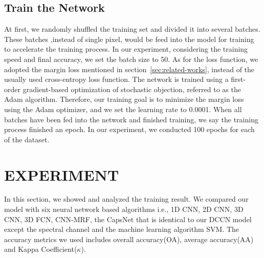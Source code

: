 \documentclass{article}
\begin{document}
	\subsection{Train the Network}\label{subsec:train-the-network}
	At first, we randomly shuffled the training set and divided it into several batches.
	These batches ,instead of single pixel, would be feed into the model for training to accelerate the training process.
	In our experiment, considering the training speed and final accuracy, we set the batch size to 50.
	As for the loss function, we adopted the margin loss mentioned in section~\ref{sec:related-works}, instead of the
	usually used cross-entropy loss function.
	The network is trained using a first-order gradient-based optimization of stochastic objection, referred to as the
	Adam algorithm.
	Therefore, our training goal is to minimize the margin loss using the Adam optimizer, and we set the learning rate
	to 0.0001.
	When all batches have been fed into the network and finished training, we say the training process finished an epoch.
	In our experiment, we conducted 100 epochs for each of the dataset.


	\section{EXPERIMENT}\label{sec:experiment}
	In this section, we showed and analyzed the training result.
	We compared our model with six neural network based algorithms i.e., 1D CNN\cite{hu2015deep},
	2D CNN\cite{sharma2016hyperspectral},
	3D CNN\cite{hamida20183},
	3D FCN\cite{lee2016contextual},
	CNN-MRF\cite{cao2018hyperspectral},
	the CapsNet that is identical to our DCCN model except the spectral channel and the machine learning algorithm SVM\@.
	The accuracy metrics we used includes overall accuracy(OA), average accuracy(AA) and Kappa Coefficient($\kappa$).
\end{document}
